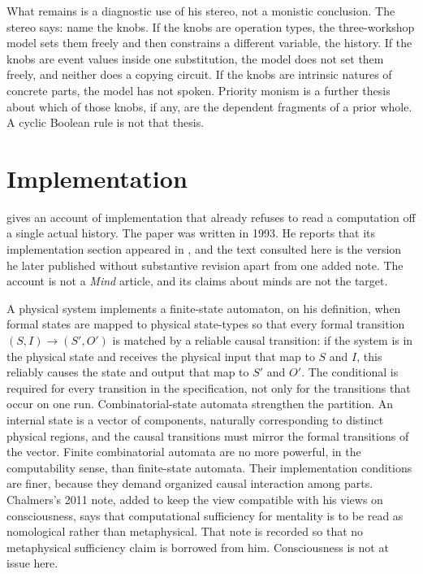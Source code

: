 \documentclass[12pt]{article}
\begin{document}
What remains is a diagnostic use of his stereo, not a monistic conclusion. The stereo says: name the knobs. If the knobs are operation types, the three-workshop model sets them freely and then constrains a different variable, the history. If the knobs are event values inside one substitution, the model does not set them freely, and neither does a copying circuit. If the knobs are intrinsic natures of concrete parts, the model has not spoken. Priority monism is a further thesis about which of those knobs, if any, are the dependent fragments of a prior whole. A cyclic Boolean rule is not that thesis.

\section{Implementation}
\label{sec:impl}

\citet{chalmers2011} gives an account of implementation that already refuses to read a computation off a single actual history. The paper was written in 1993. He reports that its implementation section appeared in \citet{chalmers1994}, and the text consulted here is the version he later published without substantive revision apart from one added note. The account is not a \emph{Mind} article, and its claims about minds are not the target.

A physical system implements a finite-state automaton, on his definition, when formal states are mapped to physical state-types so that every formal transition \((S,I)\to(S',O')\) is matched by a reliable causal transition: if the system is in the physical state and receives the physical input that map to \(S\) and \(I\), this reliably causes the state and output that map to \(S'\) and \(O'\). The conditional is required for every transition in the specification, not only for the transitions that occur on one run. Combinatorial-state automata strengthen the partition. An internal state is a vector of components, naturally corresponding to distinct physical regions, and the causal transitions must mirror the formal transitions of the vector. Finite combinatorial automata are no more powerful, in the computability sense, than finite-state automata. Their implementation conditions are finer, because they demand organized causal interaction among parts. Chalmers's 2011 note, added to keep the view compatible with his views on consciousness, says that computational sufficiency for mentality is to be read as nomological rather than metaphysical. That note is recorded so that no metaphysical sufficiency claim is borrowed from him. Consciousness is not at issue here.
\end{document}
